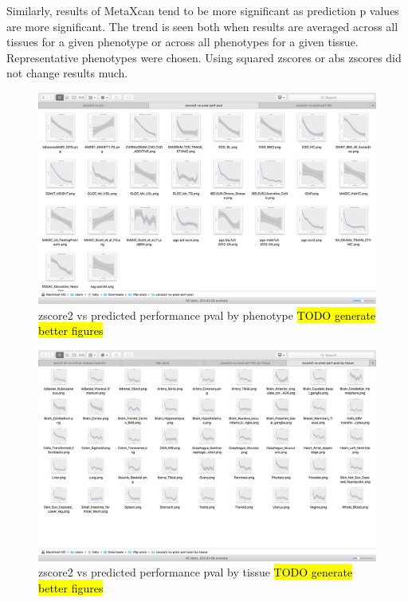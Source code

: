 \documentclass[10pt]{article}
\begin{document}
Similarly, results of MetaXcan tend to be more significant as prediction p values are more significant. The trend is seen both when results are averaged across all tissues for a given phenotype or across all phenotypes for a given tissue. Representative phenotypes were chosen. Using squared zscores or abs zscores did not change results much. 

\begin{figure}
\includegraphics[width=\textwidth]{plots/Fig7a-zscore2-vs-pred-perf-pval-by-phenotype.png}
\caption{zscore2 vs predicted performance pval by phenotype \hl{TODO generate better figures}}
\label{fig:zscore2-pval-pheno}
\end{figure}

\begin{figure}
\includegraphics[width=\textwidth]{plots/Fig7b-zscore2-vs-pred-perf-pval-by-tissue.png}
\caption{zscore2 vs predicted performance pval by tissue \hl{TODO generate better figures}}
\label{fig:zscore2-pval-tissue}
\end{figure}
\end{document}
